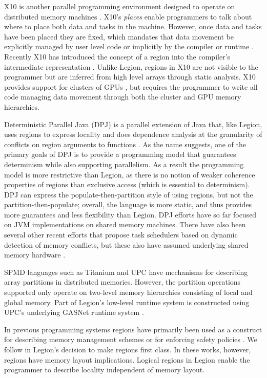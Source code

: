 X10 is another parallel programming environment designed to operate on distributed
memory machines \cite{X1005}.  X10's {\em places} enable programmers to talk about where
to place both data and tasks in the machine.  However, once data and tasks have
been placed they are fixed, which mandates that data movement be explicitly managed by
user level code or implicitly by the compiler or runtime \cite{X1008}.  Recently X10 has introduced
the concept of a region into the compiler's intermediate representation \cite{X1011}.
Unlike Legion, regions in X10 are not visible to the programmer but are inferred
from high level arrays through static analysis.  X10 provides support for clusters of GPUs
\cite{X10GPU}, but requires the programmer to write all code managing data movement
through both the cluster and GPU memory hierarchies.

Deterministic Parallel Java (DPJ) is a parallel extension of Java
that, like Legion, uses regions to express locality and does
dependence analysis at the granularity of conflicts on region
arguments to functions \cite{Bocchino09}.  As the name suggests, one
of the primary goals of DPJ is to provide a programming model that
guarantees determinism while also supporting parallelism.
As a result the programming model is more restrictive than Legion, as
there is no notion of weaker coherence properties of regions than
exclusive access (which is essential to determinism).  DPJ can express
the populate-then-partition style of using regions, but not the
partition-then-populate; overall, the language is more static, and
thus provides more guarantees and less flexibility than Legion.  
DPJ efforts have so far focused on JVM implementations on shared memory machines.
There have also been several other recent efforts that propose task schedulers
based on dynamic detection of memory conflicts, but these also have assumed
underlying shared memory hardware \cite{VTN11,Tzenakis12,EYJD12}.

SPMD languages such as Titanium \cite{TIT98} and UPC \cite{UPC99} have
mechanisms for describing array partitions in distributed memories.
However, the partition operations supported only operate on two-level
memory hierarchies consisting of local and global memory. 
Part of Legion's
low-level runtime system is constructed using UPC's underlying GASNet
runtime system \cite{GASNET07}.


In previous programming systems regions have primarily been used as a construct for
describing memory management schemes \cite{REAPS02,RC01}  
or for enforcing safety policies \cite{CYCLONE01}.  We follow \cite{RC01} in Legion's
decision to make regions first class.  In these works, however, regions have
memory layout implications.  Logical regions in Legion enable the programmer to
describe locality independent of memory layout.

